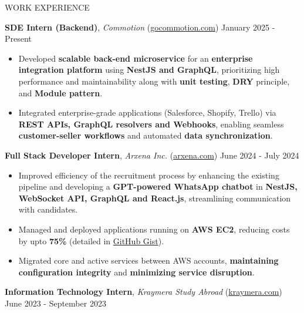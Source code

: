 \documentclass{resume} %
\begin{document}
\begin{rSection}{WORK EXPERIENCE}

    \textbf{SDE Intern (Backend)}, \textit{Commotion} (\href{https://gocommotion.com}{gocommotion.com})  \hfill January 2025 - Present

    \begin{itemize}
        \itemsep -6pt {}
            \item Developed \textbf{scalable back-end microservice} for an \textbf{enterprise integration platform} using \textbf{NestJS and GraphQL}, prioritizing high performance and maintainability along with \textbf{unit testing}, \textbf{DRY} principle, and \textbf{Module pattern}.
            \item Integrated enterprise-grade applications (Salesforce, Shopify, Trello) via \textbf{REST APIs, GraphQL resolvers and Webhooks}, enabling seamless \textbf{customer-seller workflows} and automated \textbf{data synchronization}.
    \end{itemize}

    \textbf{Full Stack Developer Intern}, \textit{Arxena Inc.} (\href{https://arxena.com}{arxena.com})  \hfill June 2024 - July 2024

    \begin{itemize}
        \itemsep -6pt {}
        \item Improved efficiency of the recruitment process by enhancing the existing
              pipeline and developing a \textbf{GPT-powered WhatsApp chatbot} in
              \textbf{NestJS, WebSocket API, GraphQL and React.js}, streamlining
              communication with candidates.
        \item  Managed and deployed applications running on \textbf{AWS EC2},
              reducing costs by upto \textbf{75\%} (detailed in \href{https://gist.github.com/ninadnaik10/7e9faf7f9d68035a5fe5a89a3a599c0d}{GitHub Gist}).
              \item Migrated core and active services between AWS accounts, \textbf{maintaining configuration integrity} and \textbf{minimizing service disruption}.
    \end{itemize}

    \textbf{Information Technology Intern}, \textit{Kraymera Study Abroad} (\href{https://kraymera.com}{kraymera.com})  \hfill June 2023 - September 2023

    \begin{itemize}
        \itemsep -6pt {}
        

\end{itemize}
\end{rSection}
\end{document}
